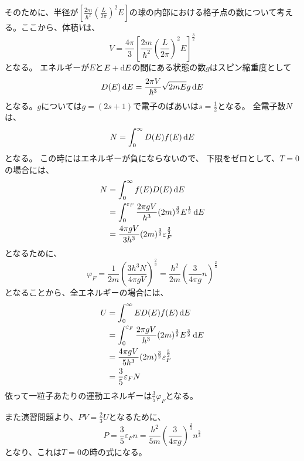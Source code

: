 \documentclass[titlepage]{ltjsarticle}
\begin{document}
そのために、半径が\(\left[ \frac{2m}{\hbar^2}\left( \frac{L}{2\pi} \right)^2 E \right]\)の球の内部における格子点の数について考える。ここから、体積\(V\)は、
\begin{equation}
  V = \frac{4\pi}{3}\left[ \frac{2m}{\hbar^2}\left( \frac{L}{2\pi} \right)^2 E \right]^{\frac{3}{2}}
\end{equation}
となる。
エネルギーが\(E\)と\(E+\odif{E}\)の間にある状態の数\(g\)はスピン縮重度として
\begin{equation}
  D(E) \odif{E} = \frac{2\pi V }{\hbar^3} \sqrt{2mE}g \odif{E}
\end{equation}
となる。\(g\)については\(g=(2s+1)\)で電子のばあいは\(s=\frac{1}{2}\)となる。
全電子数\(N\)は、
\begin{equation}
  N = \int^{\infty}_{0} D(E)f(E) \odif{E}
\end{equation}
となる。
この時にはエネルギーが負にならないので、
下限をゼロとして、\(T=0\)の場合には、
\begin{align}
  N & = \int^{\infty}_{0} f(E)D(E) \odif{E} \\
  & = \int_{0}^{\varepsilon_F} \frac{2\pi g V}{h^3} (2m)^{\frac{3}{2}} E^{\frac{1}{2}} \odif{E} \\
  & = \frac{4\pi g V }{3h^3} (2m)^{\frac{3}{2}} \varepsilon_F^{\frac{3}{2}}
\end{align}
となるために、
\begin{equation}
  \varphi_F = \frac{1}{2m}\left( \frac{3h^3N}{4\pi gV} \right)^{\frac{2}{3}} = \frac{h^2}{2m}\left( \frac{3}{4\pi g}n \right)^{\frac{2}{3}}
\end{equation}
となることから、全エネルギーの場合には、
\begin{align}
  U & = \int_{0}^{\infty} E D(E)f(E) \odif{E} \\
  & = \int_{0}^{\varepsilon_F} \frac{2\pi g V}{h^3 }(2m)^{\frac{3}{2}} E^{\frac{3}{2}} \odif{E} \\
  & = \frac{4\pi gV}{5h^3} (2m)^{\frac{3}{2}}\varepsilon_F^{\frac{5}{2}}\\
  & = \frac{3}{5}\varepsilon_F N
\end{align}
依って一粒子あたりの運動エネルギーは\(\frac{3}{5}\varphi_F\)となる。

また演習問題より、\(PV = \frac{2}{3}U\)となるために、
\begin{equation}\label{eq:2.2}
  P = \frac{3}{5}\varepsilon_F n = \frac{h^2}{5m} \left( \frac{3}{4\pi g} \right)^{
    \frac{2}{3}}n^{\frac{5}{3}}
\end{equation}
となり、これは\(T=0\)の時の式になる。
\end{document}
